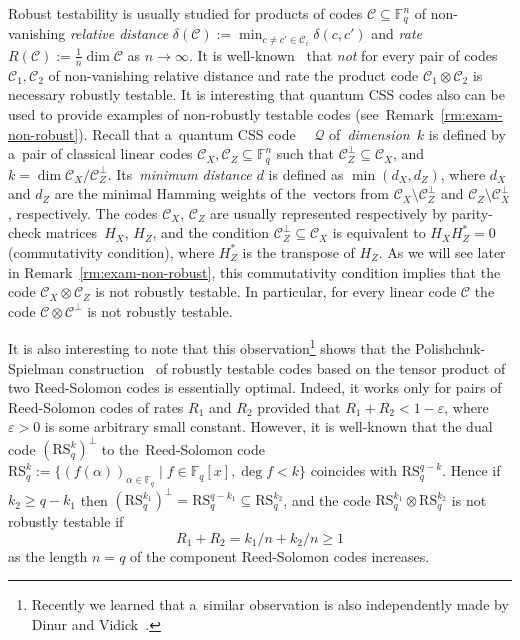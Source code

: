 \documentclass[11pt]{article}
\let\ge\geqslant
\newcommand{\eps}{\varepsilon}
\theoremstyle{plain}
\theoremstyle{definition}
\theoremstyle{remark}
\newcommand{\HX}{H_X}
\newcommand{\HZ}{H_Z}
\newcommand{\CX}{\mathcal{C}_X}
\newcommand{\CZ}{\mathcal{C}_Z}
\newcommand{\dX}{d_X}
\newcommand{\dZ}{d_Z}
\newcommand{\T}{*}
\newcommand{\zm}{0}
\newcommand{\cC}{\mathcal{C}}
\newcommand{\cQ}{\mathcal{Q}}
\newcommand{\F}{\mathbb{F}}
\begin{document}
Robust testability is usually studied for products of codes $\cC\subseteq\F_q^{n}$ of non-vanishing \emph{relative distance} $\delta(\cC) := \min_{c\ne c'\in \cC_i}\delta(c,c')$ and \emph{rate} $R(\cC):= \frac1n \dim\cC$ as $n\to\infty$. It is well-known~\cite{Valiant:2005, Goldreich:2012} that \emph{not} for every pair of codes $\cC_1, \cC_2$ of non-vanishing relative distance and rate the product code $\cC_1\otimes \cC_2$ is necessary robustly testable. It is interesting that quantum CSS codes also can be used to provide examples of non-robustly testable codes (see~Remark~\ref{rm:exam-non-robust}). Recall that a~quantum CSS code~~\cite{CSS:1996, CSS2:1996} $\cQ$ of~\emph{dimension~$k$} is defined by a~pair of classical linear codes $\CX, \CZ \subseteq \mathbb{F}_q^n$ such that $\CZ^{\perp} \subseteq
\CX$, and $k = \dim \CX / \CZ^{\perp}$. Its~\emph{minimum distance $d$} is defined as
$\min (\dX, \dZ)$, where $\dX$ and $\dZ$ are the minimal Hamming weights of
the~vectors from $\CX \setminus \CZ^{\perp}$ and $\CZ \setminus \CX^{\perp}$,
respectively. The codes $\CX$, $\CZ$ are usually represented respectively by parity-check
matrices~$\HX$, $\HZ$, and the condition
$\CZ^{\perp} \subseteq \CX$ is equivalent to $\HX \HZ^{\T} = \zm$ (commutativity condition), where $\HZ^*$ is the transpose of $\HZ$. As we will see later in Remark~\ref{rm:exam-non-robust}, this commutativity condition implies that the code $\cC_X\otimes \cC_Z$ is not robustly testable. In particular, for every linear code $\cC$ the code $\cC \otimes \cC^\perp$ is not robustly testable. 

It is also interesting to note that this observation\footnote{Recently we learned that a~similar observation is also independently made by Dinur and Vidick~\cite{Dinur:2022ex}.} shows that the Polishchuk-Spielman construction~\cite{Polishchuk:1994} of robustly testable codes based on the tensor product of two Reed-Solomon codes is essentially optimal. Indeed, it works only for pairs of Reed-Solomon codes of rates $R_1$ and $R_2$ provided that $R_1 + R_2 < 1 - \eps$, where $\eps > 0$ is some arbitrary small constant. However, it is well-known that the dual code $(\mathrm{RS}_q^{k})^\perp$ to the~Reed-Solomon code~$\mathrm{RS}_q^{k} := \{(f(\alpha))_{\alpha\in\F_q} \mid f \in \F_q[x], \deg f < k\}$ coincides with $\mathrm{RS}_q^{q-k}$. Hence if $k_2 \ge q - k_1$ then $(\mathrm{RS}_q^{k_1})^\perp = \mathrm{RS}_q^{q - k_1} \subseteq \mathrm{RS}_q^{k_2}$, and   
the code $\mathrm{RS}_q^{k_1} \otimes \mathrm{RS}_q^{k_2}$ is not robustly testable if
\[
R_1 + R_2 = k_1/n + k_2/n \ge 1
\]
as the length $n=q$ of the component Reed-Solomon codes increases.   
\end{document}
